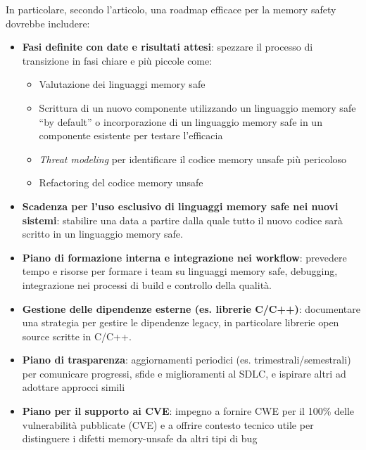 In particolare, secondo l'articolo, una roadmap efficace per la memory safety dovrebbe
includere:

\begin{itemize}
  \item \textbf{Fasi definite con date e risultati attesi}: spezzare il processo
    di transizione in fasi chiare e più piccole come:
    \begin{itemize}
      \item Valutazione dei linguaggi memory safe

      \item Scrittura di un nuovo componente utilizzando un linguaggio memory safe
        ``by default'' o incorporazione di un linguaggio memory safe in un componente
        esistente per testare l'efficacia

      \item \textit{Threat modeling} per identificare il codice memory unsafe
        più pericoloso

      \item Refactoring del codice memory unsafe
    \end{itemize}

  \item \textbf{Scadenza per l'uso esclusivo di linguaggi memory safe nei nuovi
    sistemi}: stabilire una data a partire dalla quale tutto il nuovo codice sarà
    scritto in un linguaggio memory safe.

  \item \textbf{Piano di formazione interna e integrazione nei workflow}: prevedere
    tempo e risorse per formare i team su linguaggi memory safe, debugging, integrazione
    nei processi di build e controllo della qualità.

  \item \textbf{Gestione delle dipendenze esterne (es. librerie C/C++)}: documentare
    una strategia per gestire le dipendenze legacy, in particolare librerie open
    source scritte in C/C++.

  \item \textbf{Piano di trasparenza}: aggiornamenti periodici (es. trimestrali/semestrali)
    per comunicare progressi, sfide e miglioramenti al SDLC, e ispirare altri ad
    adottare approcci simili

  \item \textbf{Piano per il supporto ai CVE}: impegno a fornire CWE per il 100\%
    delle vulnerabilità pubblicate (CVE) e a offrire contesto tecnico utile per
    distinguere i difetti memory-unsafe da altri tipi di bug
\end{itemize}

